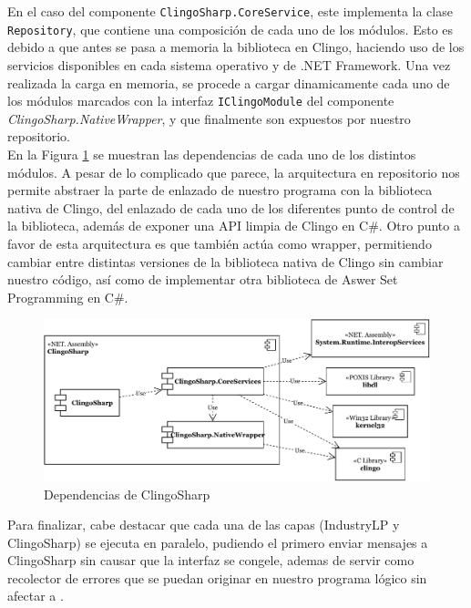 En el caso del componente \texttt{ClingoSharp.CoreService}, este implementa la clase \texttt{Repository}, que contiene una composición de cada uno de los módulos. Esto es debido a que antes se pasa a memoria la biblioteca en Clingo, haciendo uso de los servicios disponibles en cada sistema operativo y de .NET Framework. Una vez realizada la carga en memoria, se procede a cargar dinamicamente cada uno de los módulos marcados con la interfaz \texttt{IClingoModule} del componente \textit{ClingoSharp.NativeWrapper}, y que finalmente son expuestos por nuestro repositorio. \\

En la Figura \ref{fig:clingosharp} se muestran las dependencias de cada uno de los distintos módulos. A pesar de lo complicado que parece, la arquitectura en repositorio nos permite abstraer la parte de enlazado de nuestro programa con la biblioteca nativa de Clingo, del enlazado de cada uno de los diferentes punto de control de la biblioteca, además de exponer una API limpia de Clingo en C\#. Otro punto a favor de esta arquitectura es que también actúa como wrapper, permitiendo cambiar entre distintas versiones de la biblioteca nativa de Clingo sin cambiar nuestro código, así como de implementar otra biblioteca de Aswer Set Programming en C\#. \\

\begin{figure}[!h]
	\centering
	\includegraphics[width=\textwidth]{images/clingosharp}
	\caption{Dependencias de ClingoSharp}
	\label{fig:clingosharp}
\end{figure}

Para finalizar, cabe destacar que cada una de las capas (IndustryLP y ClingoSharp) se ejecuta en paralelo, pudiendo el primero enviar mensajes a ClingoSharp sin causar que la interfaz se congele, ademas de servir como recolector de errores que se puedan originar en nuestro programa lógico sin afectar a \cities.